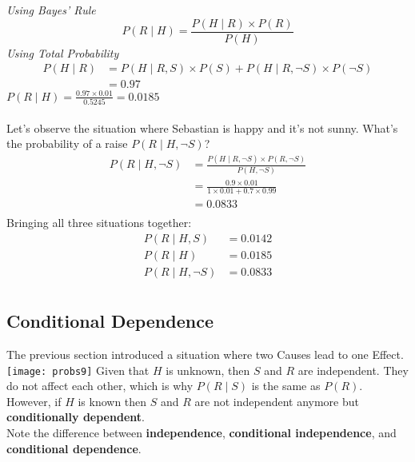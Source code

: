 \documentclass[12pt]{article}
\begin{document}
\textit{Using Bayes' Rule}
\begin{equation}
P(R \mid H) = \frac{P(H \mid R) \times P(R)}{P(H)}
\end{equation}
\textit{Using Total Probability}
\begin{align*}
P(H \mid R) &=  P(H \mid R,S) \times P(S) + P(H \mid R, \neg S) \times P(\neg S)\\
&= 0.97
\end{align*}
\(P(R \mid H) = \frac{0.97 \times 0.01}{0.5245} = 0.0185\)\\\\
Let's observe the situation where Sebastian is happy and it's not sunny. What's the probability of a raise \(P(R \mid H, \neg S)\)?\\
\begin{align*}
P(R \mid H, \neg S) &= \frac{P(H \mid R, \neg S) \times P(R, \neg S)}{P(H, \neg S)}\\
&= \frac{0.9 \times 0.01}{1 \times 0.01 + 0.7 \times 0.99}\\
&= 0.0833\\
\end{align*}
Bringing all three situations together:\\
\begin{align*}
P(R \mid H, S) &= 0.0142\\
P(R \mid H) &= 0.0185\\
P(R \mid H, \neg S) &= 0.0833\\
\end{align*}
\subsection*{Conditional Dependence}
\vspace{2em}
The previous section introduced a situation where two Causes lead to one Effect.\\
\vspace{2em}
\texttt{[image: probs9]}
Given that \(H\) is unknown, then \(S\) and \(R\) are independent. They do not affect each other, which is why \(P(R \mid S)\) is the same as \(P(R)\). However, if \(H\) is known then \(S\) and \(R\) are not independent anymore but \textbf{conditionally dependent}.\\
Note the difference between \textbf{independence}, \textbf{conditional independence}, and \textbf{conditional dependence}.\par
\end{document}
